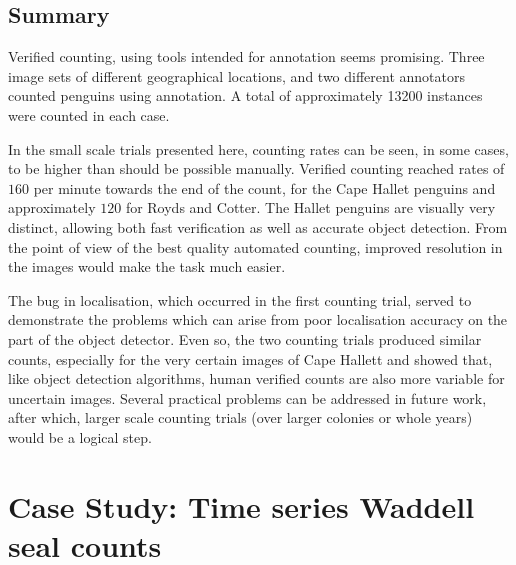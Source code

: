 \subsection{Summary}
\label{sec:penguin_conclusion}

Verified counting, using tools intended for annotation seems promising. Three image sets of different geographical locations, and two different annotators counted penguins using annotation. A total of approximately 13200 instances were counted in each case.

In the small scale trials presented here, counting rates can be seen, in some cases, to be higher than should be possible manually. Verified counting reached rates of $160$ per minute towards the end of the count, for the Cape Hallet penguins and approximately $120$ for Royds and Cotter. The Hallet penguins are visually very distinct, allowing both fast verification as well as accurate object detection. From the point of view of the best quality automated counting, improved resolution in the images would make the task much easier. 

The bug in localisation, which occurred in the first counting trial, served to demonstrate the problems which can arise from poor localisation accuracy on the part of the object detector. Even so, the two counting trials produced similar counts, especially for the very certain images of Cape Hallett and showed that, like object detection algorithms, human verified counts are also more variable for uncertain images. Several practical problems can be addressed in future work, after which, larger scale counting trials (over larger colonies or whole years) would be a logical step.

\section{Case Study: Time series Waddell seal counts \texorpdfstring{\cite{Eisert2015, Eisert2019}}{}}
\label{sec:case_seals}



